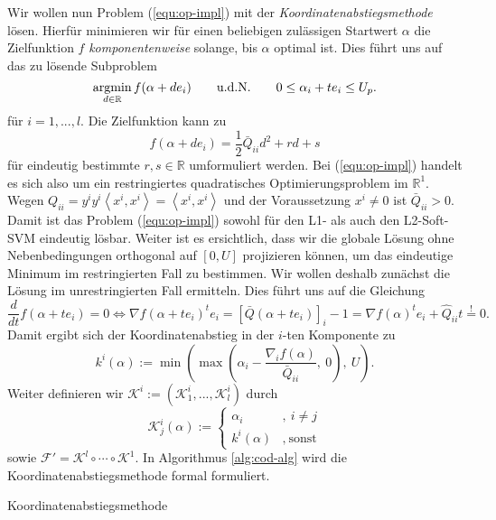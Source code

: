 Wir wollen nun Problem (\ref{equ:op-impl}) mit der \emph{Koordinatenabstiegsmethode} lösen. Hierfür minimieren wir  für einen beliebigen zulässigen Startwert $\alpha$ die Zielfunktion $f$ \emph{komponentenweise} solange, bis $\alpha$ optimal ist. Dies führt uns auf das zu lösende Subproblem 
\begin{equation}\label{equ:dec-schritt}
 	\operatorname*{argmin}_{d \in \mathbb{R}}f(\alpha+de_i) \qquad \text{u.d.N.} \qquad 0 \leq \alpha_i+te_i \leq U_p.
\end{equation}
für $i=1,...,l$. Die Zielfunktion kann zu  
$$
f(\alpha+de_i) =  \frac{1}{2}\bar{Q}_{ii}d^2 + r d + s
$$
für eindeutig bestimmte $r,s \in \mathbb{R}$ umformuliert werden. Bei (\ref{equ:op-impl}) handelt es sich also um ein restringiertes quadratisches Optimierungsproblem im $\mathbb{R}^1$. Wegen $Q_{ii} = y^i y^i \left<x^i, x^i \right> = \left< x^i, x^i \right>$ und der Voraussetzung $x^i \neq 0$ ist $\bar{Q}_{ii} > 0$. Damit ist das Problem (\ref{equ:op-impl}) sowohl für den L1- als auch den L2-Soft-SVM eindeutig lösbar. Weiter ist es ersichtlich, dass wir die globale Lösung ohne Nebenbedingungen orthogonal auf $[0, U]$ projizieren können, um das eindeutige Minimum im restringierten Fall zu bestimmen. Wir wollen deshalb zunächst die Lösung im unrestringierten Fall ermitteln. Dies führt uns auf die Gleichung
$$
\frac{d}{dt}f(\alpha+te_i) = 0 \Leftrightarrow \nabla f(\alpha+t e_i)^t e_i = [\bar{Q}(\alpha + te_i)]_i - 1 = \nabla f(\alpha)^t e_i + \hat{Q}_{ii}t \stackrel{!}{=}0.
$$
Damit ergibt sich der Koordinatenabstieg in der $i$-ten Komponente zu 
\begin{equation}
\label{equ:cd-step}
k^i(\alpha) :=
\min \left( \max \left( \alpha_i-\frac{\nabla_i f(\alpha)}{\bar{Q}_{ii}},\ 0 \right),\ U \right).
\end{equation}
Weiter definieren wir $\mathcal{K}^i := (\mathcal{K}^i_1,...,\mathcal{K}^i_l)$ durch
\begin{equation} 
\mathcal{K}^i_j(\alpha) := \left\{ \begin{array}{ll}
	\alpha_i 	&,\ i \neq j \\
	k^i (\alpha) &,\ \text{sonst}
\end{array} \right.
\end{equation}
sowie $\mathcal{F}' = \mathcal{K}^l \circ \cdots \circ \mathcal{K}^1$. In Algorithmus \ref{alg:cod-alg} wird die Koordinatenabstiegsmethode formal formuliert.

\begin{algorithm}
\KwIn{$\alpha$}
\KwOut{$\alpha$}
\caption{Koordinatenabstiegsmethode}
\label{alg:cod-alg}
\end{algorithm}

